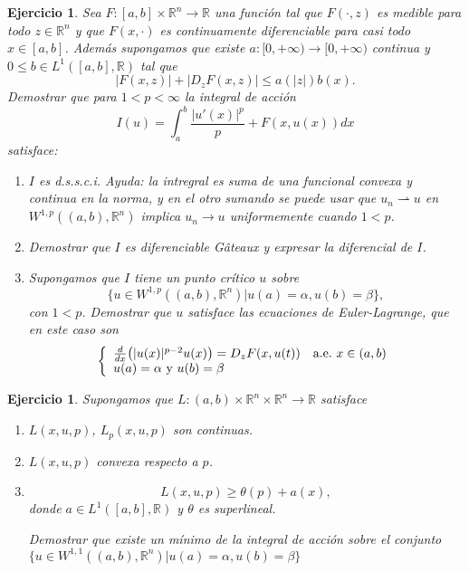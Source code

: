 \documentclass{article}
\newcounter{ejer}
\newtheorem{ejercicio}[ejer]{Ejercicio}}
\newcommand{\rr}{\mathbb{R}}
\begin{document}
\begin{ejercicio} Sea $F:[a,b]\times \rr^n\to\rr$ una función tal que $F(\cdot,z)$ es medible para todo $z\in\rr^n$ y que $F(x,\cdot)$ es continuamente diferenciable para casi todo $x\in [a,b]$. Además supongamos que existe $a:[0,+\infty)\to [0,+\infty)$ continua y $0\leq b\in  L^1([a,b],\rr)$ tal que
\[|F(x,z)|+|D_{z}F(x,z)|\leq a(|z|)b(x).\]
Demostrar que para $1< p<\infty$ la integral de acción
\[I(u)=\int_a^b\frac{|u'(x)|^p}{p}+F(x,u(x))dx\]
satisface:
\begin{enumerate}
 \item $I$ es d.s.s.c.i. \emph{Ayuda:}   la intregral es suma de una funcional convexa y continua en la norma, y en el otro sumando se puede usar que $u_n\rightharpoonup u$ en $W^{1,p}((a,b),\rr^n)$ implica $u_n\to u$ uniformemente cuando $1<p$.

 \item Demostrar que $I$ es diferenciable G\^ateaux y expresar la diferencial de $I$.

 \item Supongamos que $I$ tiene un punto crítico $u$ sobre
 \[\{u\in W^{1,p}((a,b),\rr^n)| u(a)=\alpha, u(b)=\beta\},\]
 con $1<p$. Demostrar que $u$ satisface las ecuaciones de  Euler-Lagrange, que en este caso son
 \begin{equation}\label{ProbPrin}
    \left\{%
\begin{array}{ll}
   \frac{d}{dx}\big(|u(x)|^{p-2}u(x)\big)= D_zF(x,u(t)) \quad \hbox{a.e.}\ x \in (a,b)\\
    u(a)=\alpha\text{ y } u(b)=\beta\\
\end{array}%
\right.
\end{equation}

 \end{enumerate}


\end{ejercicio}




\begin{ejercicio}\label{eq: gener_tonelli1} Supongamos que $L:(a,b)\times\rr^n\times\rr^n\to\rr$ satisface
\begin{enumerate}
 \item $L(x,u,p)$, $L_p(x,u,p)$ son continuas.
 \item $L(x,u,p)$ convexa respecto a $p$.
 \item \[L(x,u,p)\geq \theta(p)+a(x),\]
 donde $a\in L^1([a,b],\rr)$ y $\theta$ es superlineal.


 Demostrar que existe un mínimo de la integral de acción sobre el conjunto $\{u\in W^{1,1}((a,b),\rr^n)| u(a)=\alpha, u(b)=\beta\}$
\end{enumerate}


\end{ejercicio}
\end{document}
